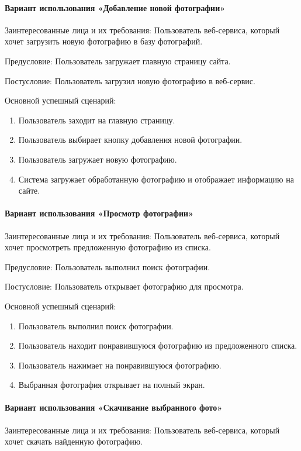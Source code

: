 \paragraph{Вариант использования «Добавление новой фотографии»}
Заинтересованные лица и их требования: Пользователь веб-сервиса, который хочет загрузить новую фотографию в базу фотографий.

Предусловие: Пользователь загружает главную страницу сайта.

Постусловие: Пользователь загрузил новую фотографию в веб-сервис.

Основной успешный сценарий:
\begin{enumerate}
	\item Пользователь заходит на главную страницу.
	\item Пользователь выбирает кнопку добавления новой фотографии.
	\item Пользователь загружает новую фотографию.
	\item Система загружает обработанную фотографию и отображает информацию на сайте.
\end{enumerate}

\paragraph{Вариант использования «Просмотр фотографии»}
Заинтересованные лица и их требования: Пользователь веб-сервиса, который хочет просмотреть предложенную фотографию из списка.

Предусловие: Пользователь выполнил поиск фотографии.

Постусловие: Пользователь открывает фотографию для просмотра.

Основной успешный сценарий:
\begin{enumerate}
	\item Пользователь выполнил поиск фотографии.
	\item Пользователь находит понравившуюся фотографию из предложенного списка.
	\item Пользователь нажимает на понравившуюся фотографию.
	\item Выбранная фотография открывает на полный экран.
\end{enumerate}

\paragraph{Вариант использования «Скачивание выбранного фото»}
Заинтересованные лица и их требования: Пользователь веб-сервиса, который хочет скачать найденную фотографию.

